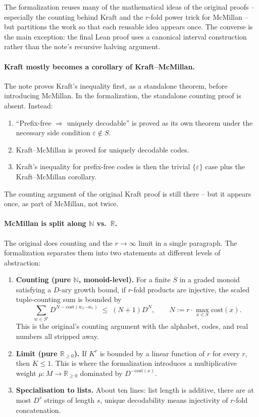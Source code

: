 \documentclass[11pt]{article}
\begin{document}
\medskip
\noindent
The formalization reuses many of the mathematical ideas of the original
proofs -- especially the counting behind Kraft and the $r$-fold power trick
for McMillan -- but partitions the work so that each reusable idea appears
once. The converse is the main exception: the final Lean proof uses a
canonical interval construction rather than the note's recursive halving
argument.

\paragraph{Kraft mostly becomes a corollary of Kraft--McMillan.} The note
proves Kraft's inequality first, as a standalone theorem, before
introducing McMillan. In the formalization, the standalone counting proof
is absent. Instead:
\begin{enumerate}[leftmargin=1.5em,itemsep=0pt]
  \item ``Prefix-free $\Rightarrow$ uniquely decodable'' is proved as its
    own theorem under the necessary side condition $\varepsilon \notin S$.
  \item Kraft--McMillan is proved for uniquely decodable codes.
  \item Kraft's inequality for prefix-free codes is then the trivial
    $\{\varepsilon\}$ case plus the Kraft--McMillan corollary.
\end{enumerate}
The counting argument of the original Kraft proof is still there -- but it
appears once, as part of McMillan, not twice.

\paragraph{McMillan is split along $\mathbb{N}$ vs.\ $\mathbb{R}$.} The
original does counting and the $r \to \infty$ limit in a single paragraph.
The formalization separates them into two statements at different levels
of abstraction:

\begin{enumerate}[leftmargin=1.5em,itemsep=0pt]
  \item \textbf{Counting (pure $\mathbb{N}$, monoid-level).} For a finite
    $S$ in a graded monoid satisfying a $D$-ary growth bound, if $r$-fold
    products are injective, the scaled tuple-counting sum is bounded by
    \[
      \sum_{w \in S^r}
        D^{N-\mathrm{cost}(w_1\cdots w_r)}
      \;\le\; (N+1)D^N,
      \qquad N := r \cdot \max_{x \in S} \mathrm{cost}(x).
    \]
    This is the original's counting argument with the alphabet, codes, and
    real numbers all stripped away.
  \item \textbf{Limit (pure $\mathbb{R}_{\ge 0}$).} If $K^r$ is bounded by
    a linear function of $r$ for every $r$, then $K \le 1$. This is where
    the formalization introduces a multiplicative weight
    $\mu\colon M \to \mathbb{R}_{\ge 0}$ dominated by
    $D^{-\mathrm{cost}(x)}$.
  \item \textbf{Specialisation to lists.} About ten lines: list length is
    additive, there are at most $D^s$ strings of length $s$, unique
    decodability means injectivity of $r$-fold concatenation.
\end{enumerate}
\end{document}
